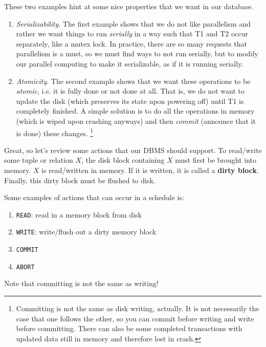 \documentclass{article}
\begin{document}
    These two examples hint at some nice properties that we want in our database. 
    \begin{enumerate}
      \item \textit{Serializability}. The first example shows that we do not like parallelism and rather we want things to run \textit{serially} in a way such that T1 and T2 occur separately, like a mutex lock. In practice, there are so many requests that parallelism is a must, so we must find ways to not run serially, but to modify our parallel computing to make it serializable, as if it is running serially.  
      \item \textit{Atomicity}. The second example shows that we want these operations to be \textit{atomic}, i.e. it is fully done or not done at all. That is, we do not want to update the disk (which preserves its state upon powering off) until  T1 is completely finished. A simple solution is to do all the operations in memory (which is wiped upon crashing anyways) and then \textit{commit} (announce that it is done) these changes. \footnote{Committing is not the same as disk writing, actually. It is not necessarily the case that one follows the other, so you can commit before writing and write before committing. There can also be some completed transactions with updated data still in memory and therefore lost in crash.} 
    \end{enumerate} 

    Great, so let's review some actions that our DBMS should support. To read/write some tuple or relation $X$, the disk block containing $X$ must first be brought into memory. $X$ is read/written in memory. If it is written, it is called a \textbf{dirty block}. Finally, this dirty block must be flushed to disk. 

    \begin{definition}[Actions]
      Some examples of actions that can occur in a schedule is: 
      \begin{enumerate}
        \item \texttt{READ}: read in a memory block from disk
        \item \texttt{WRITE}: write/flush out a dirty memory block 
        \item \texttt{COMMIT}
        \item \texttt{ABORT} 
      \end{enumerate}
      Note that committing is not the same as writing! 
    \end{definition}
\end{document}
